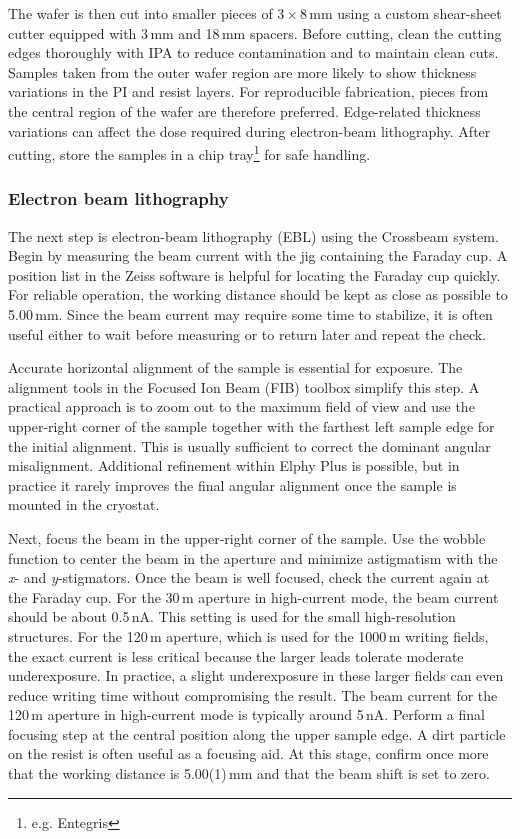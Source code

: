         The wafer is then cut into smaller pieces of 3\,$\times$\,8\,mm using a custom shear-sheet cutter equipped with 3\,mm and 18\,mm spacers. Before cutting, clean the cutting edges thoroughly with IPA to reduce contamination and to maintain clean cuts. Samples taken from the outer wafer region are more likely to show thickness variations in the PI and resist layers. For reproducible fabrication, pieces from the central region of the wafer are therefore preferred. Edge-related thickness variations can affect the dose required during electron-beam lithography. After cutting, store the samples in a chip tray\footnote{e.g. Entegris} for safe handling.

    \subsubsection*{Electron beam lithography}
        The next step is electron-beam lithography (EBL) using the Crossbeam system. Begin by measuring the beam current with the jig containing the Faraday cup. A position list in the Zeiss software is helpful for locating the Faraday cup quickly. For reliable operation, the working distance should be kept as close as possible to 5.00\,mm. Since the beam current may require some time to stabilize, it is often useful either to wait before measuring or to return later and repeat the check.

        Accurate horizontal alignment of the sample is essential for exposure. The alignment tools in the Focused Ion Beam (FIB) toolbox simplify this step. A practical approach is to zoom out to the maximum field of view and use the upper-right corner of the sample together with the farthest left sample edge for the initial alignment. This is usually sufficient to correct the dominant angular misalignment. Additional refinement within Elphy Plus is possible, but in practice it rarely improves the final angular alignment once the sample is mounted in the cryostat.

        Next, focus the beam in the upper-right corner of the sample. Use the wobble function to center the beam in the aperture and minimize astigmatism with the \textit{x}- and \textit{y}-stigmators. Once the beam is well focused, check the current again at the Faraday cup. For the 30\,\textmu m aperture in high-current mode, the beam current should be about 0.5\,nA. This setting is used for the small high-resolution structures. For the 120\,\textmu m aperture, which is used for the 1000\,\textmu m writing fields, the exact current is less critical because the larger leads tolerate moderate underexposure. In practice, a slight underexposure in these larger fields can even reduce writing time without compromising the result. The beam current for the 120\,\textmu m aperture in high-current mode is typically around 5\,nA. Perform a final focusing step at the central position along the upper sample edge. A dirt particle on the resist is often useful as a focusing aid. At this stage, confirm once more that the working distance is 5.00(1)\,mm and that the beam shift is set to zero.

